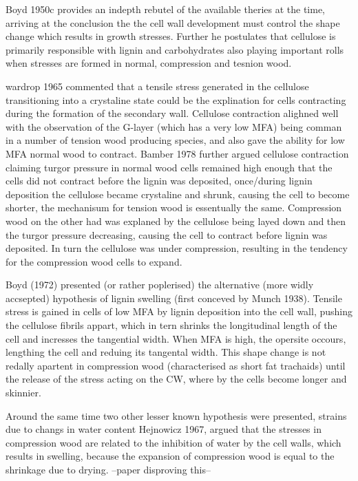 \documentclass{article}
\begin{document}
Boyd 1950c provides an indepth rebutel of the available theries at the time,
arriving at the conclusion the the cell wall development must control the shape
change which results in growth stresses. Further he postulates that cellulose
is primarily responsible with lignin and carbohydrates also playing important
rolls when stresses are formed in normal, compression and tesnion wood.

wardrop 1965 commented that a tensile stress generated in the cellulose
transitioning into a crystaline state could be the explination for cells
contracting during the formation of the secondary wall. Cellulose contraction
alighned well with the observation of the G-layer (which has  a very low
MFA) being comman in a number of tension wood producing species, and also gave
the ability for low MFA normal wood to contract. Bamber 1978 further argued
cellulose contraction claiming turgor pressure in normal wood cells remained
high enough that the cells did not contract before the lignin was deposited,
once/during lignin deposition the cellulose became crystaline and shrunk,
causing the cell to become shorter, the mechanisum for tension wood is
essentually the same. Compression wood on the other had was explaned by the
cellulose being layed down and then the turgor pressure decreasing, causing the
cell to contract before lignin was deposited. In turn the cellulose was under
compression, resulting in the tendency for the compression wood cells to
expand.

Boyd (1972) presented (or rather poplerised) the alternative (more widly
accsepted) hypothesis of lignin swelling (first conceved by Munch 1938). Tensile
stress is gained in cells of low MFA by lignin deposition into the cell wall,
pushing the cellulose fibrils appart, which in tern shrinks the longitudinal
length of the cell and incresses the tangential width. When MFA is high, the
opersite occours, lengthing the cell and reduing its tangental width. This shape
change is not redally apartent in compression wood (characterised as short fat
trachaids) until the release of the stress acting on the CW, where by the cells
become longer and skinnier.

Around the same time two other lesser known hypothesis were presented,  strains
due to changs in water content Hejnowicz 1967, argued that the stresses in
compression wood are related to the inhibition of water by the cell walls,
which results in swelling, because the expansion of compression wood is equal to
the shrinkage due to drying. --paper disproving this--
\end{document}
